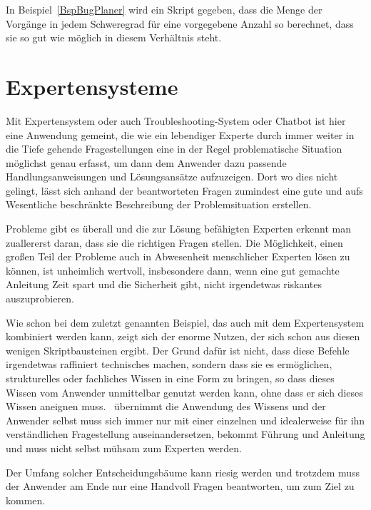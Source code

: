 In Beispiel~\ref{BspBugPlaner} wird ein Skript gegeben, dass die Menge der Vorgänge in jedem Schweregrad für eine vorgegebene Anzahl so berechnet, dass sie so gut wie möglich in diesem Verhältnis steht.

\section{Expertensysteme}\label{Expertensystem}
Mit Expertensystem oder auch Troubleshooting-System oder Chatbot ist hier eine Anwendung gemeint, die wie ein lebendiger Experte durch immer weiter in die Tiefe gehende Fragestellungen eine in der Regel problematische Situation möglichst genau erfasst, um dann dem Anwender dazu passende Handlungsanweisungen und Lösungsansätze aufzuzeigen. Dort wo dies nicht gelingt, lässt sich anhand der beantworteten Fragen zumindest eine gute und aufs Wesentliche beschränkte Beschreibung der Problemsituation erstellen.

Probleme gibt es überall und die zur Lösung befähigten Experten erkennt man zuallererst daran, dass sie die richtigen Fragen stellen. Die Möglichkeit, einen großen Teil der Probleme auch in Abwesenheit menschlicher Experten lösen zu können, ist unheimlich wertvoll, insbesondere dann, wenn eine gut gemachte Anleitung Zeit spart und die Sicherheit gibt, nicht irgendetwas riskantes auszuprobieren.

Wie schon bei dem zuletzt genannten Beispiel, das auch mit dem Expertensystem kombiniert werden kann, zeigt sich der enorme Nutzen, der sich schon aus diesen wenigen Skriptbausteinen ergibt. Der Grund dafür ist nicht, dass diese Befehle irgendetwas raffiniert technisches machen, sondern dass sie es ermöglichen, strukturelles oder fachliches Wissen in eine Form zu bringen, so dass dieses Wissen vom Anwender unmittelbar genutzt werden kann, ohne dass er sich dieses Wissen aneignen muss. \FPZ\ übernimmt die Anwendung des Wissens und der Anwender selbst muss sich immer nur mit einer einzelnen und idealerweise für ihn verständlichen Fragestellung auseinandersetzen, bekommt Führung und Anleitung und muss nicht selbst mühsam zum Experten werden.

Der Umfang solcher Entscheidungsbäume kann riesig werden und trotzdem muss der Anwender am Ende nur eine Handvoll Fragen beantworten, um zum Ziel zu kommen.


